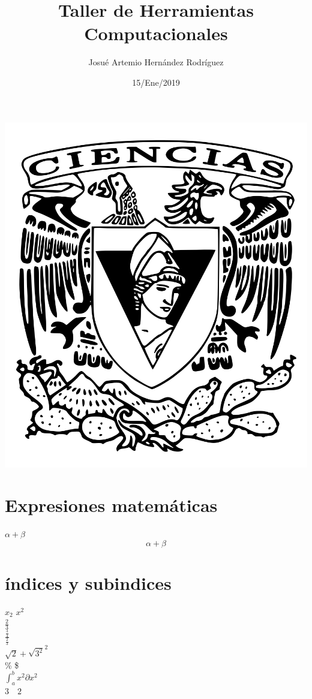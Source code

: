 \documentclass{article}
\title{\Huge Taller de Herramientas Computacionales}
\author{Josué Artemio Hernández Rodríguez}
\date{15/Ene/2019}
\begin{document}
	\maketitle
	\begin{center}
		\includegraphics[scale=0.3]{2.png}
	\end{center}
\newpage

\section*{Expresiones matemáticas}
$\alpha + \beta$\\ %
\[\alpha + \beta\]

\section*{índices y subindices}
$x_{2}$
$x^{2}$	\\

$\frac{2}{3}$\\
$\frac{\frac{3}{4}}{\frac{2}{3}}$\\

$\sqrt{2} + \sqrt{3^2}^2$\\

\%  \$	\\
$\int_{a}^{b} x^2 \partial x^2$\\
$3\quad 2$ 


	
	
	
\end{document}
